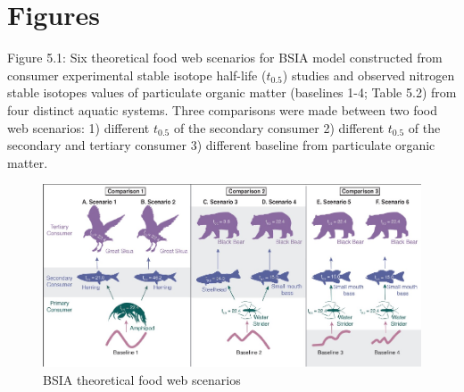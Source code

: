 \documentclass [11pt, proquest] {uwthesis}[2015/03/03]
\begin{document}
\section{Figures}\label{figures-4}
\begin{landscape}
Figure 5.1: Six theoretical food web scenarios for BSIA model constructed from consumer experimental stable isotope half-life ($t_{0.5}$) studies and observed nitrogen stable isotopes values of particulate organic matter (baselines 1-4; Table 5.2) from four distinct aquatic systems. Three comparisons were made between two food web scenarios: 1) different $t_{0.5}$ of the secondary consumer 2) different $t_{0.5}$ of the secondary and tertiary consumer 3) different baseline from particulate organic matter. 
\newline 
\begin{figure}[h]
\centering
  \includegraphics[width=1.05\textwidth]{figure/Ch5/Figure1.pdf}
  \caption{BSIA theoretical food web scenarios}
  \label{fig:BSIA}
\end{figure}
\end{landscape}
\clearpage
\end{document}

